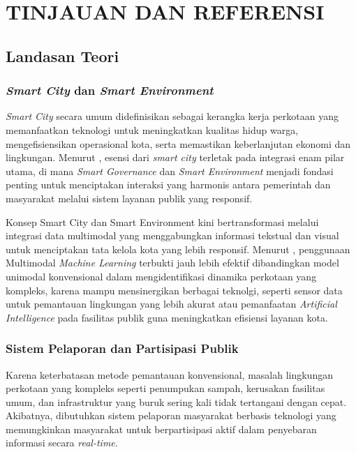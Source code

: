 \chapter{TINJAUAN DAN REFERENSI}

\section{Landasan Teori}

\subsection{\textit{Smart City} dan \textit{Smart Environment}}
\textit{Smart City} secara umum didefinisikan sebagai kerangka kerja perkotaan yang memanfaatkan teknologi untuk meningkatkan kualitas hidup warga, mengefisiensikan operasional kota, serta memastikan keberlanjutan ekonomi dan lingkungan. Menurut \citep{siretPublicComplainingBlessing2022}, esensi dari \textit{smart city} terletak pada integrasi enam pilar utama, di mana \textit{Smart Governance} dan \textit{Smart Environment} menjadi fondasi penting untuk menciptakan interaksi yang harmonis antara pemerintah dan masyarakat melalui sistem layanan publik yang responsif.

Konsep Smart City dan Smart Environment kini bertransformasi melalui integrasi data multimodal yang menggabungkan informasi tekstual dan visual untuk menciptakan tata kelola kota yang lebih responsif. 
Menurut \citep{sadiqSensingSmartCities2025}, penggunaan Multimodal \textit{Machine Learning} terbukti jauh lebih efektif dibandingkan model unimodal konvensional dalam mengidentifikasi dinamika perkotaan yang kompleks, 
karena mampu mensinergikan berbagai teknolgi, seperti sensor data untuk pemantauan lingkungan yang lebih akurat atau pemanfaatan \textit{Artificial Intelligence} pada fasilitas publik guna meningkatkan efisiensi layanan kota.

\subsection{Sistem Pelaporan dan Partisipasi Publik }
Karena keterbatasan metode pemantauan konvensional, masalah lingkungan perkotaan yang kompleks seperti penumpukan sampah, kerusakan fasilitas umum, dan infrastruktur yang buruk sering kali tidak tertangani dengan cepat. Akibatnya, dibutuhkan sistem pelaporan masyarakat berbasis teknologi yang memungkinkan masyarakat untuk berpartisipasi aktif dalam penyebaran informasi secara \textit{real-time}. 

